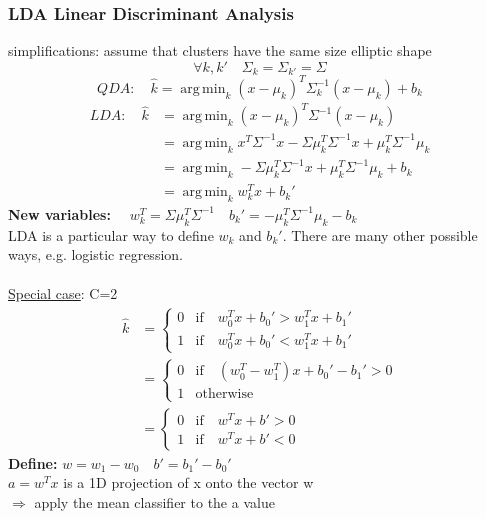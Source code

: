 \documentclass[11pt]{article}
\DeclareMathOperator*{\argmin}{arg\,min}
\begin{document}
      \subsubsection{LDA Linear Discriminant Analysis}
        simplifications: assume that clusters have the same size elliptic shape
        \begin{equation*}
          \forall k, k' \quad \Sigma_k = \Sigma_{k'} = \Sigma
        \end{equation*}
        \begin{equation*}
          QDA: \quad \hat{k} = \argmin_{k}(x-\mu_k)^T\Sigma_k^{-1}(x-\mu_k)+b_k
        \end{equation*}
        \begin{equation*}
          \begin{align*}
            LDA: \quad \hat{k} &=\argmin_k(x-\mu_k)^T\Sigma^{-1}(x-\mu_k) \\
            &=\argmin_k x^T\Sigma^{-1}x-\Sigma\mu_k^T\Sigma^{-1}x+\mu_k^T\Sigma^{-1}\mu_k \\
            &=\argmin_k -\Sigma \mu_k^T\Sigma^{-1}x+\mu_k^T\Sigma^{-1}\mu_k+b_k \\
            &=\argmin_k w_k^Tx+b_k'
          \end{align*}
        \end{equation*}
        \textbf{New variables:} $\quad w_k^T=\Sigma\mu_k^T\Sigma^{-1}
        \quad b_k'=-\mu_k^T\Sigma^{-1}\mu_k-b_k$ \\
        LDA is a particular way to define $w_k$ and $b_k'$. There are many other
        possible ways, e.g. logistic regression. \\ \\
        \underline{Special case}: C=2
        \begin{equation*}
          \begin{align*}
          \hat{k} &=
            \begin{cases}
              0 & \text{if} \quad w_0^Tx+b_0' > w_1^Tx+b_1' \\
              1 & \text{if} \quad w_0^Tx+b_0' < w_1^Tx+b_1'
            \end{cases} \\
            &=\begin{cases}
              0 & \text{if} \quad (w_0^T-w_1^T)x+b_0'-b_1' > 0 \\
              1 & \text{otherwise}
            \end{cases} \\
            &=\begin{cases}
              0 & \text{if} \quad w^Tx+b' > 0 \\
              1 & \text{if} \quad w^Tx + b' < 0
            \end{cases}
          \end{align*}
        \end{equation*}
        \textbf{Define:} $w=w_1-w_0 \quad b'=b_1'-b_0'$ \\
        $a=w^Tx$ is a 1D projection of x onto the vector w \\
        $\Rightarrow$ apply the mean classifier to the a value
\end{document}
